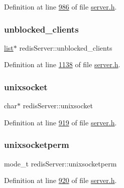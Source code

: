 Definition at line \hyperlink{server_8h_source_l00986}{986} of file \hyperlink{server_8h_source}{server.\+h}.

\mbox{\label{structredisServer_a0d0abff88ddc7c66f8ce92650dc029e3}} 
\subsubsection{\texorpdfstring{unblocked\+\_\+clients}{unblocked\_clients}}
{\footnotesize\ttfamily \hyperlink{structlist}{list}$\ast$ redis\+Server\+::unblocked\+\_\+clients}



Definition at line \hyperlink{server_8h_source_l01138}{1138} of file \hyperlink{server_8h_source}{server.\+h}.

\mbox{\label{structredisServer_a7ecf9f841acf632ecacfeb16ebe93df4}} 
\subsubsection{\texorpdfstring{unixsocket}{unixsocket}}
{\footnotesize\ttfamily char$\ast$ redis\+Server\+::unixsocket}



Definition at line \hyperlink{server_8h_source_l00919}{919} of file \hyperlink{server_8h_source}{server.\+h}.

\mbox{\label{structredisServer_a95f7aa118bee69e53345eb490cc80f59}} 
\subsubsection{\texorpdfstring{unixsocketperm}{unixsocketperm}}
{\footnotesize\ttfamily mode\+\_\+t redis\+Server\+::unixsocketperm}



Definition at line \hyperlink{server_8h_source_l00920}{920} of file \hyperlink{server_8h_source}{server.\+h}.

\mbox{\label{structredisServer_a23a513df1ffbeb51d16a2554416f5de5}} 
